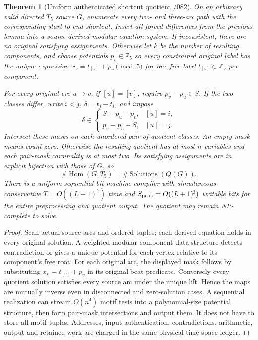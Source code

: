 \documentclass[11pt]{article}
\newtheorem{theorem}{Theorem}
\begin{document}
\begin{theorem}[Uniform authenticated shortcut quotient /082]
On an arbitrary valid directed $T_5$ source $G$, enumerate every
two- and three-arc path with the corresponding start-to-end shortcut.
Insert all forced differences from the previous lemma into a
source-derived modular-equation system. If inconsistent, there are
no original satisfying assignments. Otherwise let $k$ be the number
of resulting components, and choose potentials $p_v\in\mathbb Z_5$
so every constrained original label has the unique expression
$x_v=t_{[v]}+p_v\pmod5$ for one free label
$t_{[v]}\in\mathbb Z_5$ per component.

For every original arc $u\to v$, if $[u]=[v]$, require
$p_v-p_u\in S$. If the two classes differ, write
$i<j$, $\delta=t_j-t_i$, and impose
\[
 \delta\in
 \begin{cases}
 S+p_u-p_v,&[u]=i,\\
 p_v-p_u-S,&[u]=j.
 \end{cases}
\]
Intersect these masks on each unordered pair of quotient classes.
An empty mask means count zero. Otherwise the resulting quotient
has at most $n$ variables and each pair-mask cardinality is at most
two. Its satisfying assignments are in explicit bijection with
those of $G$, so
\[
 \boxed{\#\operatorname{Hom}(G,T_5)=
       \#\operatorname{Solutions}(Q(G)).}
\]
There is a uniform sequential bit-machine compiler with
simultaneous conservative
$T=O((L+1)^7)$ time and $S_{\rm peak}=O((L+1)^3)$ writable bits
for the \emph{entire preprocessing and quotient output}.
The quotient may remain NP-complete to solve.
\end{theorem}
\begin{proof}
Scan actual source arcs and ordered tuples; each derived equation
holds in every original solution. A weighted modular component
data structure detects contradiction or gives a unique
potential for each vertex relative to its component's free root.
For each original arc, the displayed mask follows by substituting
$x_v=t_{[v]}+p_v$ in its original beat predicate. Conversely
every quotient solution satisfies every source arc under the
unique lift. Hence the maps are mutually inverse even in
disconnected and zero-solution cases. A sequential realization
can stream $O(n^4)$ motif tests into a polynomial-size potential
structure, then form pair-mask intersections and output them.
It does not have to store all motif tuples. Addresses, input
authentication, contradictions, arithmetic, output and retained
work are charged in the same physical time-space ledger.
\end{proof}
\end{document}
